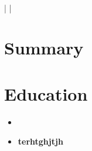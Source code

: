 \documentclass{article}
\begin{document}
\begin{center}
    {\Huge \bfseries }
    \vspace{2mm} \\
    \href{mailto:}{} |  | \href{http://}{}

\end{center}

\section*{Summary}


\section*{Education}
\begin{itemize}[leftmargin=*]
    \item \item \textbf{terhtghjtjh}
\end{itemize}
\end{document}
